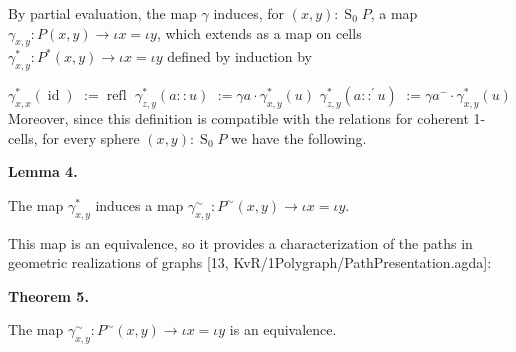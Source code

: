 \documentclass[10pt,a4paper]{amsart}
\begin{document}
 
 
By partial evaluation, the map $\gamma$ induces, for $(x,y):\operatorname{S}_{0}P$, a map $\gamma_{x,y}:P(x,y)\to\iota x=\iota y$, which extends as a map on cells $\gamma^{*}_{x,y}:P^{*}(x,y)\to\iota x=\iota y$ defined by induction by\par
    $\displaystyle\gamma^{*}_{x,x}(\operatorname{id})$ $\displaystyle:=\operatorname{refl}$ $\displaystyle\gamma^{*}_{z,y}(a::u)$ $\displaystyle:=\gamma a\cdot{\gamma^{*}_{x,y}(u)}$ $\displaystyle\gamma^{*}_{z,y}(a::^{\prime}u)$ $\displaystyle:=\gamma a^{-}\cdot{\gamma^{*}_{x,y}(u)}$    
Moreover, since this definition is compatible with the relations for coherent 1-cells, for every sphere $(x,y):\operatorname{S}_{0}P$ we have the following.\par
 
 
 
\par\medskip\noindent\textbf{Lemma 4.}\par
 
 
The map $\gamma^{*}_{x,y}$ induces a map $\gamma^{\sim}_{x,y}:P^{\sim}(x,y)\to\iota x=\iota y$.\par
 
 
 
 
This map is an equivalence, so it provides a characterization of the paths in geometric realizations of graphs [13, KvR/1Polygraph/PathPresentation.agda]:\par
 
 
 
\par\medskip\noindent\textbf{Theorem 5.}\par
 
 
The map $\gamma^{\sim}_{x,y}:P^{\sim}(x,y)\to\iota x=\iota y$ is an equivalence.\par
 
 
 
 
\end{document}
